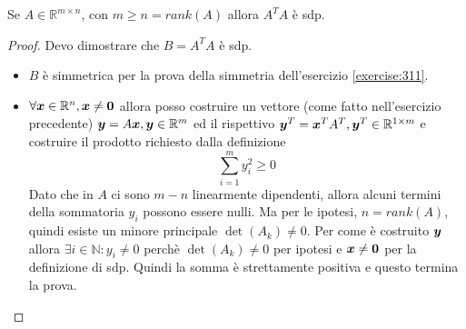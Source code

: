 \begin{exercise}[3.12]
Se $A \in \mathbb{R}^{m \times n}$, con $m \geq n = rank(A)$ allora $A^{T}A$ \`e
sdp.
\end{exercise}
\begin{proof}
Devo dimostrare che $B = A^{T}A$ \`e sdp.
\begin{itemize}
  \item $B$ \`e simmetrica per la prova della simmetria dell'esercizio
  \ref{exercise:311}.
  \item $\forall \boldsymbol{x} \in \mathbb{R}^{n}, \boldsymbol{x} \not = \boldsymbol{0}$ allora
  posso costruire un vettore (come fatto nell'esercizio precedente) $\boldsymbol{y} =
  A\boldsymbol{x}, \boldsymbol{y} \in \mathbb{R}^{m}$ ed il rispettivo $\boldsymbol{y}^{T} = 
  \boldsymbol{x}^{T}A^{T}, \boldsymbol{y}^{T} \in \mathbb{R}^{1 \times m}$ e costruire il 
  prodotto richiesto dalla definizione
  \begin{displaymath}
  	\sum_{i = 1}^{m}{y_{i}^{2}} \geq 0
  \end{displaymath}
  Dato che in $A$ ci sono $m-n$ linearmente dipendenti, allora alcuni termini
  della sommatoria $y_{i}$ possono essere nulli. Ma per le ipotesi, $n =
  rank(A)$, quindi esiste un minore principale $\det(A_{k}) \not = 0$. Per come
  \`e costruito $\boldsymbol{y}$ allora $\exists i \in \mathbb{N}: y_{i} \not = 0$
  perch\`e $\det(A_{k}) \not = 0$ per ipotesi e $\boldsymbol{x} \not = \boldsymbol{0}$ per
  la definizione di sdp. Quindi la somma \`e strettamente positiva e questo
  termina la prova.
\end{itemize}
\end{proof}

